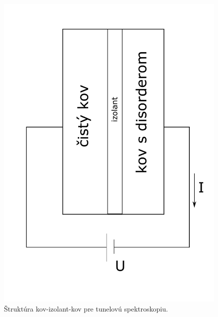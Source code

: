 \begin{figure}
        \centering
        \includegraphics[origin=c,scale=0.4]{grafy/schema}
        \caption{Štruktúra kov-izolant-kov pre tunelovú spektroskopiu.}
        \label{fig:schema}
    \end{figure}
